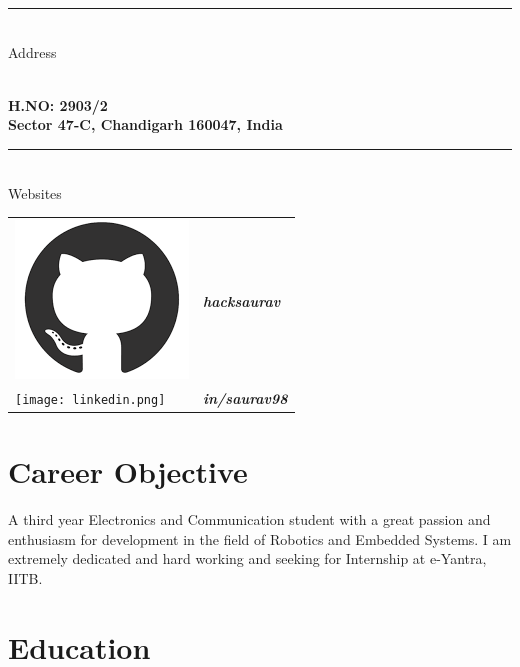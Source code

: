 \documentclass[11pt]{article}
\begin{document}
\begin{vwcol}[widths={0.235,0.6}, sep=1.3cm, justify=flush, rule=0.1pt, indent=0em]
\rule{3.9cm}{0.1pt}\\
\selectfont Address\vspace{1.5mm}\\
 \fontsize{10pt}{12pt} \selectfont
\begin{minipage}{3.9cm}
\bfseries\\H.NO: 2903/2 \\Sector 47-C,
 Chandigarh 160047, India\vspace{1mm}\\
\end{minipage}
\fontsize{11.5pt}{14pt}\selectfont

\rule{3.9cm}{0.1pt}\\
\selectfont Websites\vspace{3mm}\\
\begin{tabular}{m{4mm}m{2cm}}
\includegraphics[scale=0.12]{github.png}&\bfseries\selectfont\textit{hacksaurav}\\
\texttt{[image: linkedin.png]}&\bfseries\selectfont\textit{in/saurav98}\\
\end{tabular}

\newpage 
\mdseries\fontsize{10pt}{13pt}\selectfont
\begin{minipage}{12.73cm}

\section{Career Objective}
 A third year Electronics and Communication student with a great passion and enthusiasm for development in the field of Robotics and Embedded Systems. I am extremely dedicated and hard working and seeking for Internship at e-Yantra, IITB.\\

\section{Education}
\begin{tabular}{ |p{1cm}||p{3cm}|p{3cm}|p{2cm}|p{2cm}|  }
 \hline
 

\end{tabular}
\end{minipage}
\end{vwcol}
\end{document}
